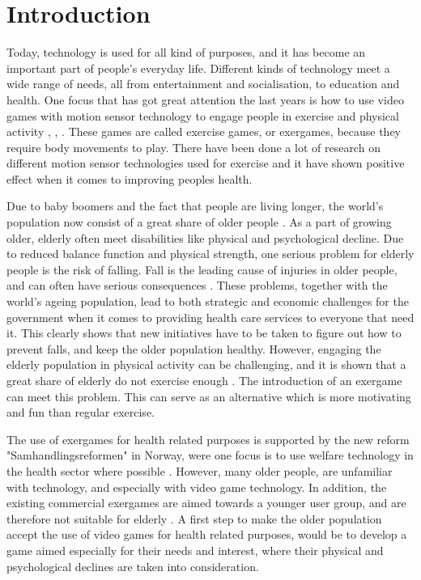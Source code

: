 \chapter{Introduction}

Today, technology is used for all kind of purposes, and it has become an important part of people's everyday life. Different kinds of technology meet a wide range of needs, all from entertainment and socialisation, to education and health. One focus that has got great attention the last years is how to use video games with motion sensor technology to engage people in exercise and physical activity \cite{exergamesforelderly}, \cite{gerling1}, \cite{garcia2012exergames}. These games are called exercise games, or exergames, because they require body movements to play. There have been done a lot of research on different motion sensor technologies used for exercise and it have shown positive effect when it comes to improving peoples health. 

Due to baby boomers and the fact that people are living longer, the world's population now consist of a great share of older people \cite{dickinson2007methods}. As a part of growing older, elderly often meet disabilities like physical and psychological decline. Due to reduced balance function and physical strength, one serious problem for elderly people is the risk of falling. Fall is the leading cause of injuries in older people, and can often have serious consequences  \cite{otago}. These problems, together with the world's ageing population, lead to both strategic and economic challenges for the government when it comes to providing health care services to everyone that need it. This clearly shows that new initiatives have to be taken to figure out how to prevent falls, and keep the older population healthy. However, engaging the elderly population in physical activity can be challenging, and it is shown that a great share of elderly do not exercise enough \cite{statistikknorge12}. The introduction of an exergame can meet this problem. This can serve as an alternative which is more motivating and fun than regular exercise.  

The use of exergames for health related purposes is supported by the new reform "Samhandlingsreformen" in Norway, were one focus is to use welfare technology in the health sector where possible \cite{welfare}. However, many older people, are unfamiliar with technology, and especially with video game technology. In addition, the existing commercial exergames are aimed towards a younger user group, and are therefore not suitable for elderly \cite{exergamesforelderly}. A first step to make the older population accept the use of video games for health related purposes, would be to develop a game aimed especially for their needs and interest, where their physical and psychological declines are taken into consideration. 

